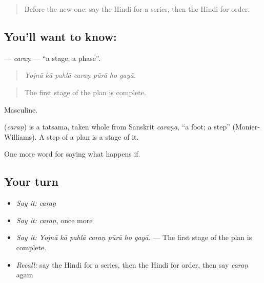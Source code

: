 \label{lesson:HI-C553-caran}



\begin{quote}
Before the new one: say the Hindi for a series, then the Hindi for order.
\end{quote}

\subsection*{You'll want to know: }
\textbf{} — \emph{caraṇ} — \textquotedblleft{}a stage, a phase\textquotedblright{}.

\begin{quote}
      
\end{quote}

\begin{quote}
\emph{Yojnā kā pahlā caraṇ pūrā ho gayā.}
\end{quote}

\begin{quote}
The first stage of the plan is complete.
\end{quote}

Masculine.

\begin{cousinweb}
\textbf{} (\emph{caraṇ}) is a tatsama, taken whole from Sanskrit \emph{caraṇa}, \textquotedblleft{}a foot; a step\textquotedblright{} (Monier-Williams). A step of a plan is a stage of it.
\end{cousinweb}

\begin{grammarlens}[title={What you've built}]
One more word for saying what happens if.
\end{grammarlens}

\subsection*{Your turn}
\begin{itemize}
\raggedright
  \item \emph{Say it:} \emph{caraṇ}
  \item \emph{Say it:} \emph{caraṇ}, once more
  \item \emph{Say it:} \emph{Yojnā kā pahlā caraṇ pūrā ho gayā.} — The first stage of the plan is complete.
  \item \emph{Recall:} say the Hindi for a series, then the Hindi for order, then say \emph{caraṇ} again
\end{itemize}


